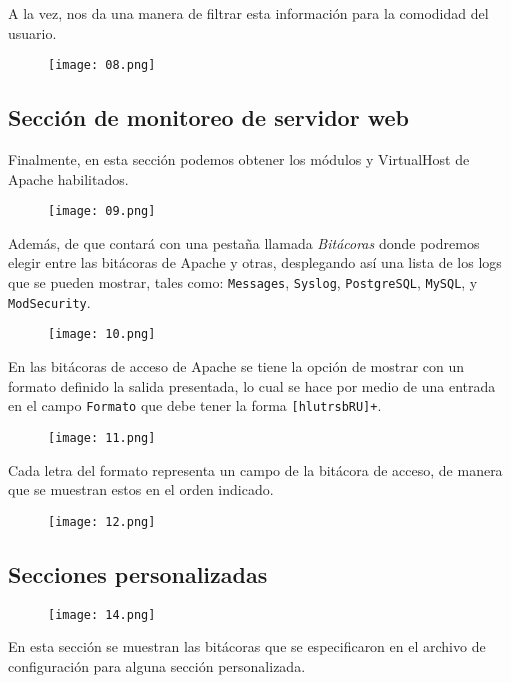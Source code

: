 \documentclass[12pt]{article}
\begin{document}
A la vez, nos da una manera de filtrar esta información para la comodidad del usuario.

\begin{figure}[H]
  \centering
  \texttt{[image: 08.png]}  
\end{figure}

\subsection{Sección de monitoreo de servidor web}

Finalmente, en esta sección podemos obtener los módulos y VirtualHost de \textsf{Apache} habilitados.

\begin{figure}[H]
  \centering
  \texttt{[image: 09.png]}  
\end{figure}

 Además, de que contará con una pestaña llamada \textit{Bitácoras} donde podremos elegir entre las bitácoras de \textsf{Apache} y otras, desplegando así una lista de los logs que se pueden mostrar, tales como: \texttt{Messages}, \texttt{Syslog}, \texttt{PostgreSQL}, \texttt{MySQL}, y \texttt{ModSecurity}.

\begin{figure}[H]
  \centering
  \texttt{[image: 10.png]}  
\end{figure}

En las bitácoras de acceso de \textsf{Apache} se tiene la opción de mostrar con un formato definido la salida presentada, lo cual se hace por medio de una entrada en el campo \texttt{Formato} que debe tener la forma \texttt{[hlutrsbRU]+}.
\begin{figure}[H]
  \centering
  \texttt{[image: 11.png]}  
\end{figure}

Cada letra del formato representa un campo de la bitácora de acceso, de manera que se muestran estos en el orden indicado.
\begin{figure}[H]
  \centering
  \texttt{[image: 12.png]}  
\end{figure}

\subsection{Secciones personalizadas}

\begin{figure}[H]
  \centering
  \texttt{[image: 14.png]}  
\end{figure}
En esta sección se muestran las bitácoras que se especificaron en el archivo de configuración para alguna sección personalizada.
\end{document}
